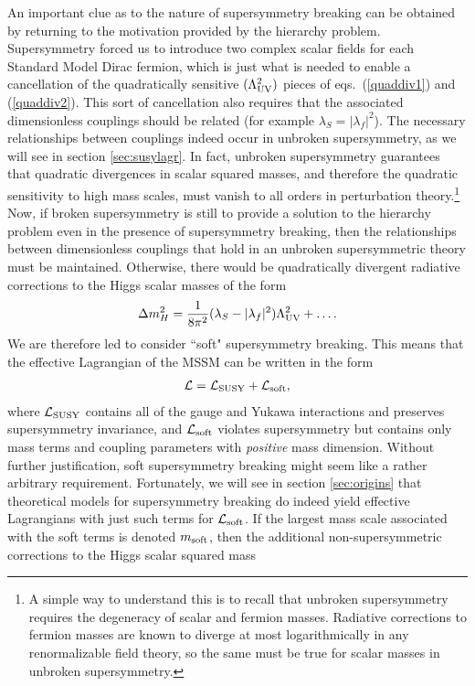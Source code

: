 \documentclass[11pt]{article}
\def\beq{\begin{eqnarray}}
\def\eeq{\end{eqnarray}}
\def\lagr{{\cal L}}
\begin{document}
An important clue as to the nature of supersymmetry breaking can be
obtained by returning to the motivation provided by the hierarchy problem.
Supersymmetry forced us to introduce two complex scalar fields for each
Standard Model Dirac fermion, which is just what is needed to enable a
cancellation of the quadratically sensitive $(\Lambda_{\rm UV}^2)$ pieces
of eqs.~(\ref{quaddiv1}) and (\ref{quaddiv2}). This sort of cancellation
also requires that the associated dimensionless couplings should be
related (for example $\lambda_S = |\lambda_f|^2$). The necessary relationships
between couplings indeed occur in unbroken supersymmetry, as we will see
in section \ref{sec:susylagr}. In fact, unbroken supersymmetry guarantees
that quadratic divergences in scalar squared masses, and therefore the quadratic sensitivity to high mass scales, must vanish to all
orders in perturbation theory.\footnote{A simple way to understand this is
to recall that unbroken supersymmetry requires the degeneracy of scalar
and fermion masses. Radiative corrections to fermion masses are known to
diverge at most logarithmically in any renormalizable
field theory, so the same must be
true for scalar masses in unbroken supersymmetry.} Now, if broken
supersymmetry is still to provide a solution to the hierarchy problem even
in the presence of supersymmetry breaking, then the relationships between
dimensionless couplings that hold in an unbroken supersymmetric theory
must be maintained. Otherwise, there would be quadratically divergent
radiative corrections to the Higgs scalar masses of the form
\beq
\Delta m_H^2 = {1\over 8\pi^2} (\lambda_S - |\lambda_f|^2)
\Lambda_{\rm UV}^2 + \ldots .
\label{eq:royalewithcheese}
\eeq
We are therefore led to consider ``soft" supersymmetry breaking. This
means that the effective Lagrangian of the MSSM can be written in the form
\beq
\lagr = \lagr_{\rm SUSY} + \lagr_{\rm soft},
\eeq
where $\lagr_{\rm SUSY}$ contains all of the gauge and Yukawa interactions
and preserves supersymmetry invariance, and $\lagr_{\rm soft}$ violates
supersymmetry but contains only mass terms and coupling parameters with {\it
positive} mass dimension. Without further justification, soft
supersymmetry breaking might seem like a rather arbitrary requirement.
Fortunately, we will see in section \ref{sec:origins} that theoretical
models for supersymmetry breaking do indeed yield effective Lagrangians
with just such terms for $\lagr_{\rm soft}$. If the largest mass scale
associated with the soft terms is denoted $m_{\rm soft}$, then the
additional non-supersymmetric corrections to the Higgs scalar squared mass
\end{document}
